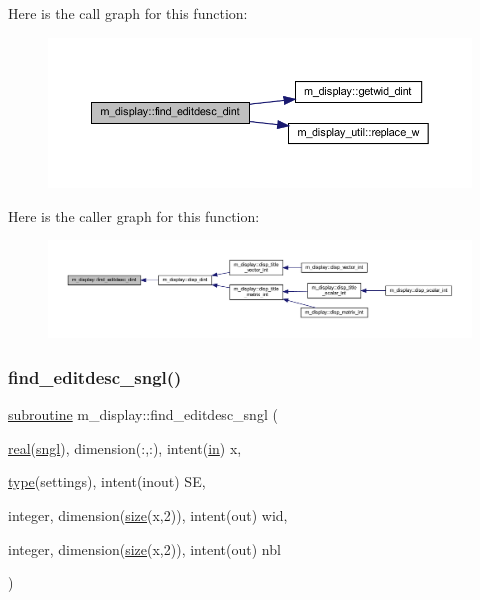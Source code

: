 Here is the call graph for this function\+:
\nopagebreak
\begin{figure}[H]
\begin{center}
\leavevmode
\includegraphics[width=350pt]{namespacem__display_ab6e1e0eb1c077b4d2a0c6698c78925a3_cgraph}
\end{center}
\end{figure}
Here is the caller graph for this function\+:
\nopagebreak
\begin{figure}[H]
\begin{center}
\leavevmode
\includegraphics[width=350pt]{namespacem__display_ab6e1e0eb1c077b4d2a0c6698c78925a3_icgraph}
\end{center}
\end{figure}
\mbox{\label{namespacem__display_aa41974a4b32f6169cadb3da72991653f}} 
\subsubsection{\texorpdfstring{find\+\_\+editdesc\+\_\+sngl()}{find\_editdesc\_sngl()}}
{\footnotesize\ttfamily \hyperlink{M__stopwatch_83_8txt_acfbcff50169d691ff02d4a123ed70482}{subroutine} m\+\_\+display\+::find\+\_\+editdesc\+\_\+sngl (\begin{DoxyParamCaption}\item[{\hyperlink{read__watch_83_8txt_abdb62bde002f38ef75f810d3a905a823}{real}(\hyperlink{namespacem__display_a2ac86bc535c3ccc5947dbb3109c666b5}{sngl}), dimension(\+:,\+:), intent(\hyperlink{M__journal_83_8txt_afce72651d1eed785a2132bee863b2f38}{in})}]{x,  }\item[{\hyperlink{stop__watch_83_8txt_a70f0ead91c32e25323c03265aa302c1c}{type}(settings), intent(inout)}]{SE,  }\item[{integer, dimension(\hyperlink{what__overview_81_8txt_ab5692ed87074f1d5ec850a9ffa8b5af9}{size}(x,2)), intent(out)}]{wid,  }\item[{integer, dimension(\hyperlink{what__overview_81_8txt_ab5692ed87074f1d5ec850a9ffa8b5af9}{size}(x,2)), intent(out)}]{nbl }\end{DoxyParamCaption})\hspace{0.3cm}{\ttfamily [private]}}



